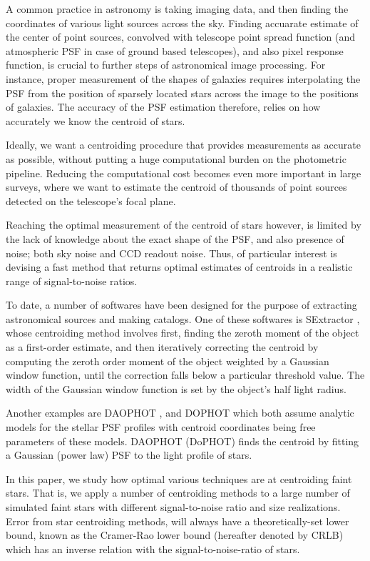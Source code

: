 \documentclass[12pt, preprint]{aastex}
\begin{document}
A common practice in astronomy is taking imaging data, and then finding the coordinates
of various light sources across the sky. Finding accuarate estimate of the center of point
sources, convolved with telescope point spread function (and atmospheric PSF in case of
ground based telescopes), and also pixel response function, is crucial to further steps of
astronomical image processing. For instance, proper measurement of the shapes of galaxies
requires interpolating the PSF from the position of sparsely located stars across the
image to the positions of galaxies. The accuracy of the PSF estimation therefore,
relies on how accurately we know the centroid of stars. 

Ideally, we want a centroiding procedure that provides measurements as accurate as possible,
without putting a huge computational burden on the photometric pipeline.
Reducing the computational cost becomes even more important in large surveys,
where we want to estimate the centroid of thousands of point sources detected
on the telescope's focal plane. 

Reaching the optimal measurement of the centroid of stars however, is limited
by the lack of knowledge about the exact shape of the PSF, and also presence of noise;
both sky noise and CCD readout noise. Thus, of particular interest is devising a fast method that returns
optimal estimates of centroids in a realistic range of signal-to-noise ratios.

To date, a number of softwares have been designed for the purpose of extracting astronomical
sources and making catalogs. One of these softwares is SExtractor \citep{sex},
whose centroiding method involves first, finding the zeroth moment of the object
as a first-order estimate, and then iteratively correcting the centroid by computing
the zeroth order moment of the object weighted by a Gaussian window function,
until the correction falls below a particular threshold value.
The width of the Gaussian window function is set by the object's half light radius.

Another examples are DAOPHOT \citep{daophot}, and DOPHOT \citep{dophot}
which both assume analytic models for the stellar PSF profiles with centroid
coordinates being free parameters of these models.
DAOPHOT (DoPHOT) finds the centroid by fitting a Gaussian (power law) PSF to
the light profile of stars.

In this paper, we study how optimal various techniques are at centroiding 
faint stars. That is, we apply a number of centroiding methods 
to a large number of simulated faint stars with different signal-to-noise ratio and
 size realizations. Error from star centroiding methods, will always have 
a theoretically-set lower bound, known as the Cramer-Rao lower bound
(hereafter denoted by CRLB) which has an inverse relation with the
signal-to-noise-ratio of stars.
\end{document}
